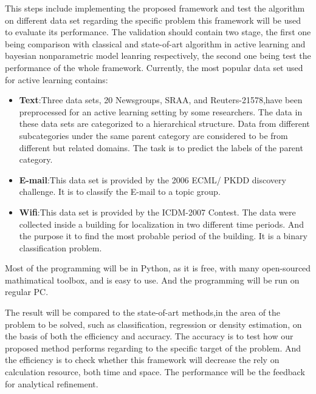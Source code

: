 \begin{enumerate}
 This steps include implementing the proposed framework and test the algorithm on different data set regarding the specific problem this framework will be used to evaluate its performance. The validation should contain two stage, the first one being comparison with classical and state-of-art algorithm in active learning and bayesian nonparametric model leanring respectively, the second one being test the performance of the whole framework. Currently, the most popular data set used for active learning contains:
 \begin{itemize}
 \item{\textbf{Text}}:Three data sets, 20 Newsgroups, SRAA, and Reuters-21578,have been preprocessed for an active learning setting by some researchers. The data in these data sets are categorized to a hierarchical structure. Data from different subcategories under the same parent category are considered to be from different but related domains. The task is to predict the labels of the parent category.
 \item{\textbf{E-mail}}:This data set is provided by the 2006 ECML/ PKDD discovery challenge. It is to classify the E-mail to a topic group.
 \item{\textbf{Wifi}}:This data set is provided by the ICDM-2007 Contest.
 The data were collected inside a building for localization in two
different time periods. And the purpose it to find the most probable period of the building. It is a binary classification problem.
 \end{itemize}
 
 Most of the programming will be in Python, as it is free, with many open-sourced mathimatical toolbox, and is easy to use. And the programming will be run on regular PC. 
 
 
 The result will be compared to the state-of-art methods,in the area of the problem to be solved, such as classification, regression or density estimation, on the basis of both the efficiency and accuracy. The accuracy is to test how our proposed method performs regarding to the specific target of the problem. And the efficiency is to check whether this framework will decrease the rely on calculation resource, both time and space. The performance will be the feedback for analytical refinement.
\end{enumerate}